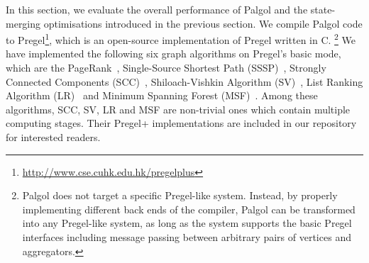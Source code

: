\documentclass{sokendai_thesis} %
\newcommand{\plus}{\raisebox{.25ex}{\scalebox{.8}{+}}}
\newcommand{\plusplus}{\plus\plus}
\newcommand{\PP}{Pregel+}
\begin{document}
In this section, we evaluate the overall performance of Palgol and the state-merging optimisations introduced in the previous section.
We compile Palgol code to Pregel\plus\footnote{\url{http://www.cse.cuhk.edu.hk/pregelplus}}, which is an open-source implementation of Pregel written in C\plusplus.%
\footnote{Palgol does not target a specific Pregel-like system.
Instead, by properly implementing different back ends of the compiler, Palgol can be transformed into any Pregel-like system, as long as the system supports the basic Pregel interfaces including message passing between arbitrary pairs of vertices and aggregators.}
We have implemented the following six graph algorithms on Pregel\plus's basic mode, which are the PageRank~\cite{pregel}, Single-Source Shortest Path (SSSP)~\cite{pregel}, Strongly Connected Components (SCC)~\cite{yan2015effective}, Shiloach-Vishkin Algorithm (SV)~\cite{yan2015effective}, List Ranking Algorithm (LR)~\cite{yan2015effective} and Minimum Spanning Forest (MSF)~\cite{boruvka}.
Among these algorithms, SCC, SV, LR and MSF are non-trivial ones which contain multiple computing stages.
Their \PP{} implementations are included in our repository for interested readers.

\end{document}
